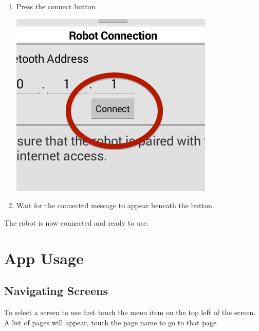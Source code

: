 \documentclass[]{article}   	%
\begin{document}
{{\begin{enumerate}
\begin{center}
		\end{center}		
	\item Press the connect button\\
		\begin{center}
			\includegraphics[scale=0.5]{connect.png}
		\end{center}		
	\item Wait for the connected message to appear beneath the button. 
\end{enumerate}

\par{The robot is now connected and ready to use.}
}



\section{App Usage}
\subsection{Navigating Screens}
\par{To select a screen to use first touch the menu item on the top left of the screen. A list of pages will appear, touch the page name to go to that page	}
}
\end{document}
